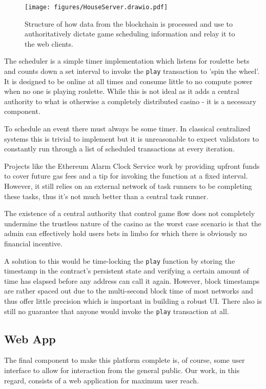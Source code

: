 \documentclass[10pt,journal,compsoc]{IEEEtran}
\begin{document}
\begin{figure}[!h]
    \centering
    \texttt{[image: figures/HouseServer.drawio.pdf]}
    \caption{Structure of how data from the blockchain is processed and use to authoritatively dictate game scheduling information and relay it to the web clients.}
    \label{fig:housserver}
\end{figure}

The scheduler is a simple timer implementation which listens for roulette bets and counts down a set interval to invoke the \texttt{play} transaction to 'spin the wheel'. It is designed to be online at all times and consume little to no compute power when no one is playing roulette. While this is not ideal as it adds a central authority to what is otherwise a completely distributed casino - it is a necessary component.

To schedule an event there must always be some timer. In classical centralized systems this is trivial to implement but it is unreasonable to expect validators to constantly run through a list of scheduled transactions at every iteration.

Projects like the Ethereum Alarm Clock Service \cite{ethereum_alarm_clock_documentation} work by providing upfront funds to cover future gas fees and a tip for invoking the function at a fixed interval. However, it still relies on an external network of task runners to be completing these tasks, thus it's not much better than a central task runner.

The existence of a central authority that control game flow does not completely undermine the trustless nature of the casino as the worst case scenario is that the admin can effectively hold users bets in limbo for which there is obviously no financial incentive.

A solution to this would be time-locking the \texttt{play} function by storing the timestamp in the contract's persistent state and verifying a certain amount of time has elapsed before any address can call it again. However, block timestamps are rather spaced out due to the multi-second block time of most networks and thus offer little precision which is important in building a robust UI. There also is still no guarantee that anyone would invoke the \texttt{play} transaction at all.
\subsection{Web App}
The final component to make this platform complete is, of course, some user interface to allow for interaction from the general public. Our work, in this regard, consists of a web application for maximum user reach. 
\end{document}
